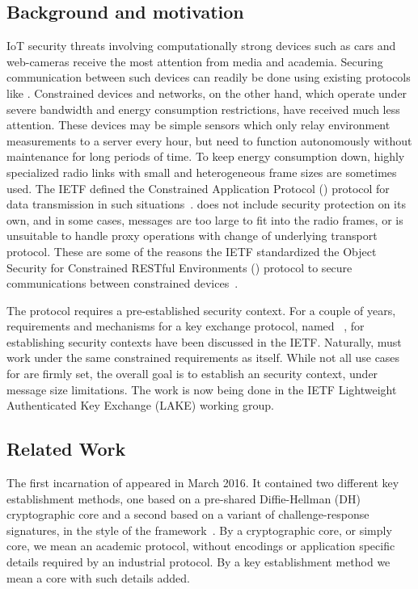 \documentclass[runningheads, envcountsame, hidelinks, a4paper, x11names]{article}
\begin{document}
\subsection{Background and motivation}
\label{sec:motivation}
IoT security threats involving computationally strong devices such as cars
and web-cameras receive the most attention from media and academia.
%
Securing communication between such devices can readily be done using existing
protocols like \mDandTls.
%
Constrained devices and networks, on the other hand, which operate under severe
bandwidth and energy consumption restrictions, have received much less
attention.
%
These devices may be simple sensors which only relay environment
measurements to a server every hour, but need to function autonomously without
maintenance for long periods of time.
%
To keep energy consumption down, highly specialized radio links with small
and heterogeneous frame sizes are sometimes used.
%
The IETF defined the Constrained Application Protocol (\mCoap{}) protocol for
data transmission in such situations~\cite{rfc7252}.
%
\mCoap{} does not include security protection on its own, and in some cases,
\mDandTls{} messages are too large to fit into the radio frames, or is
unsuitable to handle proxy operations with change of underlying transport
protocol.
%
These are some of the reasons the IETF standardized the Object Security for
Constrained RESTful Environments
(\mOscore{}) protocol to secure communications between constrained
devices~\cite{rfc8613}.
%

The \mOscore{} protocol requires a pre-established security context.
%
For a couple of years, requirements and mechanisms for a key
exchange protocol, named \mEdhoc~\cite{selander-lake-edhoc-01}, for
establishing \mOscore{} security contexts have been discussed in the IETF.
%
Naturally, \mEdhoc{} must work under the same constrained requirements as
\mOscore{} itself.
%
While not all use cases for \mEdhoc{} are firmly set, the overall goal is to
establish an \mOscore{} security context, under message size limitations.
%
The work is now being done in the IETF Lightweight Authenticated Key Exchange
(LAKE) working group.
%

\subsection{Related Work}
\label{sec:relatedWork}
%
The first incarnation of \mEdhoc{} appeared in March 2016.
%
It contained two different key establishment methods, one based on a
pre-shared Diffie-Hellman (DH) cryptographic core and a second based on a
variant of challenge-response signatures, in the style of the \mNoise{}
framework~\cite{perrin2016noise}.
%
By a cryptographic core, or simply core, we mean an academic protocol, without
encodings or application specific details required by an industrial protocol.
%
By a key establishment method we mean a core with such details added.
%
\end{document}

